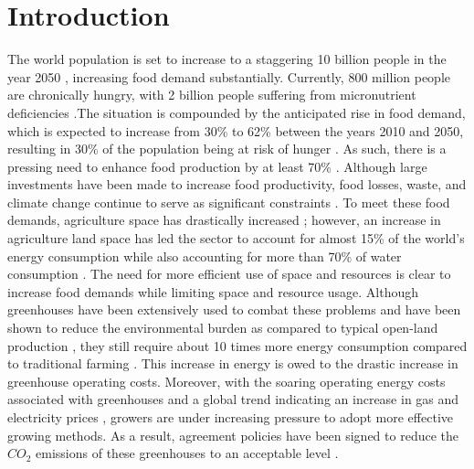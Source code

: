 \chapter{Introduction}
\label{chapter:introduction, written in the present tense}

The world population is set to increase to a staggering 10 billion people in the year 2050 \cite{blazhevskaGrowingSlowerPace2019}, increasing food demand substantially. Currently, 800 million people are chronically hungry, with 2 billion people suffering from micronutrient deficiencies \cite{faoFutureFoodAgriculture2017}.The situation is compounded by the anticipated rise in food demand, which is expected to increase from 30\% to 62\% between the years 2010 and 2050, resulting in 30\% of the population being at risk of hunger \cite{vandijkMetaanalysisProjectedGlobal2021}. As such, there is a pressing need to enhance food production by at least 70\% \cite{nishatGreenDealGreenhouse2020}. Although large investments have been made to increase food productivity, food losses, waste, and climate change continue to serve as significant constraints \cite{faoFutureFoodAgriculture2017}. To meet these food demands, agriculture space has drastically increased \cite{winklerGlobalLandUse2021}; however, an increase in agriculture land space has led the sector to account for almost 15\% of the world's energy consumption while also accounting for more than 70\% of water consumption \cite{nishatGreenDealGreenhouse2020}. The need for more efficient use of space and resources is clear to increase food demands while limiting space and resource usage. Although greenhouses have been extensively used to combat these problems and have been shown to reduce the environmental burden as compared to typical open-land production \cite{munozComparingEnvironmentalImpacts2008}, they still require about 10 times more energy consumption compared to traditional farming \cite{nishatGreenDealGreenhouse2020}. This increase in energy is owed to the drastic increase in greenhouse operating costs.  Moreover, with the soaring operating energy costs associated with greenhouses and a global trend indicating an increase in gas and electricity prices \cite{alvarezWhatSoaringEnergy2021}, growers are under increasing pressure to adopt more effective growing methods. As a result, agreement policies have been signed to reduce the $CO_2$ emissions of these greenhouses to an acceptable level \cite{breukersPowerDutchGreenhouse}. \\



